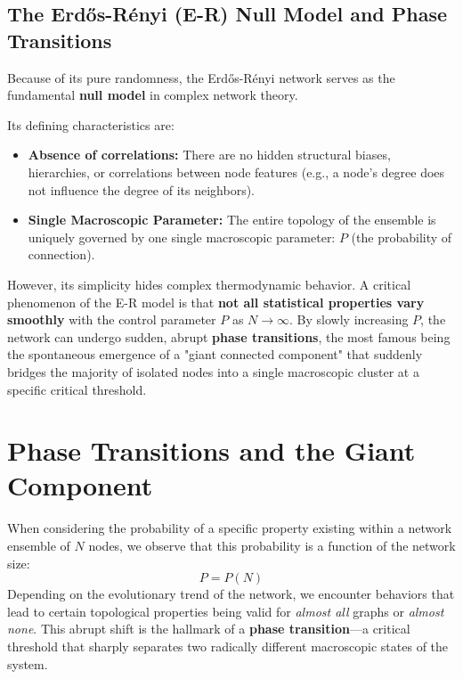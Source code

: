 \subsection{The Erdős-Rényi (E-R) Null Model and Phase Transitions}

Because of its pure randomness, the Erdős-Rényi network serves as the fundamental \textbf{null model} in complex network theory.

Its defining characteristics are:
\begin{itemize}
    \item \textbf{Absence of correlations:} There are no hidden structural biases, hierarchies, or correlations between node features (e.g., a node's degree does not influence the degree of its neighbors).
    \item \textbf{Single Macroscopic Parameter:} The entire topology of the ensemble is uniquely governed by one single macroscopic parameter: \( P \) (the probability of connection).
\end{itemize}

However, its simplicity hides complex thermodynamic behavior. A critical phenomenon of the E-R model is that \textbf{not all statistical properties vary smoothly} with the control parameter \( P \) as \( N \to \infty \).
By slowly increasing \( P \), the network can undergo sudden, abrupt \textbf{phase transitions}, the most famous being the spontaneous emergence of a "giant connected component" that suddenly bridges the majority of isolated nodes into a single macroscopic cluster at a specific critical threshold.








\section{Phase Transitions and the Giant Component}

When considering the probability of a specific property existing within a network ensemble of \(N\) nodes, we observe that this probability is a function of the network size:
\[
    P = P(N)
\]
Depending on the evolutionary trend of the network, we encounter behaviors that lead to certain topological properties being valid for \textit{almost all} graphs or \textit{almost none}. This abrupt shift is the hallmark of a \textbf{phase transition}—a critical threshold that sharply separates two radically different macroscopic states of the system.

